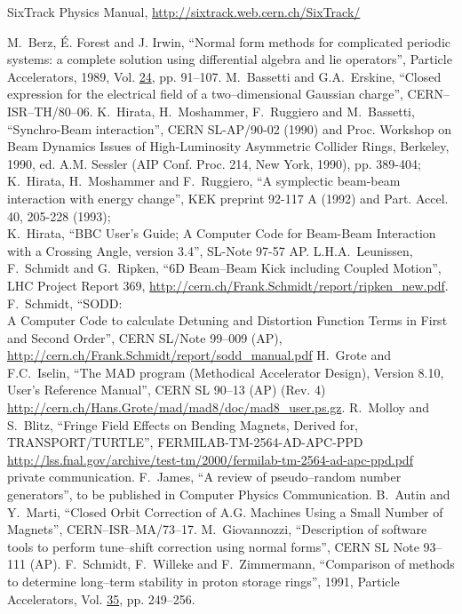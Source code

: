 \begin{thebibliography}{99}
     SixTrack Physics Manual, \url{http://sixtrack.web.cern.ch/SixTrack/}
    
     M.~Berz, \'{E}. Forest
      and J. Irwin, ``Normal form methods for complicated periodic
      systems: a complete solution using differential algebra and lie
      operators'', Particle Accelerators, 1989, Vol. \underline{24}, pp.
      91--107.  
     M.~Bassetti and G.A.~Erskine,
      ``Closed expression for the electrical field of a two--dimensional
      Gaussian charge'', CERN--ISR--TH/80--06.  
     K.~Hirata, H.~Moshammer, F.~Ruggiero and M.~Bassetti,
      ``Synchro-Beam interaction'', CERN SL-AP/90-02 (1990) and Proc.
      Workshop on Beam Dynamics Issues of High-Luminosity Asymmetric
      Collider Rings, Berkeley, 1990, ed. A.M. Sessler (AIP Conf.  Proc.
      214, New York, 1990), pp. 389-404;\\
      K.~Hirata, H.~Moshammer and F.~Ruggiero, ``A symplectic beam-beam
      interaction with energy change'', KEK preprint 92-117 A (1992) and
      Part. Accel. 40, 205-228 (1993);\\
      K.~Hirata, ``BBC User's Guide; A Computer Code for Beam-Beam Interaction 
      with a Crossing Angle, version 3.4'', SL-Note 97-57 AP.
     L.H.A.~Leunissen, F.~Schmidt and G.~Ripken, ``6D
      Beam--Beam Kick including Coupled Motion'', LHC Project Report 369,
      \url{http://cern.ch/Frank.Schmidt/report/ripken\_new.pdf}.
     F.~Schmidt, ``SODD:\\ A Computer Code to calculate
      Detuning and Distortion Function Terms in First and Second Order'',
      CERN SL/Note 99--009 (AP),
      \url{http://cern.ch/Frank.Schmidt/report/sodd\_manual.pdf}
      H.~Grote and F.C.~Iselin, ``The MAD program (Methodical Accelerator
      Design), Version 8.10, User's Reference Manual'', CERN SL 90--13
      (AP) (Rev. 4)\\
      \url{http://cern.ch/Hans.Grote/mad/mad8/doc/mad8\_user.ps.gz}.
    R.~Molloy and S.~Blitz, ``Fringe Field Effects on Bending Magnets, Derived for, 
    TRANSPORT/TURTLE'', FERMILAB-TM-2564-AD-APC-PPD
    \url{http://lss.fnal.gov/archive/test-tm/2000/fermilab-tm-2564-ad-apc-ppd.pdf}
     private communication.  
     F.~James, ``A review of
      pseudo--random number generators'', to be published in Computer
      Physics Communication.  
     B.~Autin and Y.~Marti, ``Closed Orbit Correction of
      A.G. Machines Using a Small Number of Magnets'',
      CERN--ISR--MA/73--17.
     M.~Giovannozzi,
      ``Description of software tools to perform tune--shift correction
      using normal forms'', CERN SL Note 93--111 (AP).
     F.~Schmidt, F.~Willeke and F.~Zimmermann,
      ``Comparison of methods to determine long--term stability in proton
      storage rings'', 1991, Particle Accelerators, Vol. \underline{35},
      pp. 249--256.  
    

\end{thebibliography}
